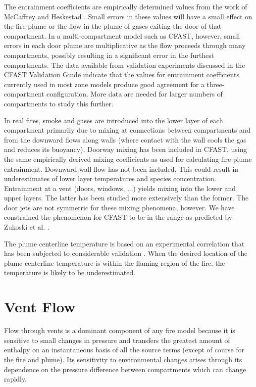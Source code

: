 The entrainment coefficients are empirically determined values from the work of McCaffrey \cite{McCaffrey:1983} and Heskestad \cite{Heskestad:1984}. Small errors in these values will have a small effect on the fire plume or the flow in the plume of gases exiting the door of that compartment.  In a multi-compartment model such as CFAST, however, small errors in each door plume are multiplicative as the flow proceeds through many compartments, possibly resulting in a significant error in the furthest compartments.  The data available from validation experiments \cite{Peacock:1988} discussed in the CFAST Validation Guide \cite{CFAST_Valid_Guide_6} indicate that the values for entrainment coefficients currently used in most zone models produce good agreement for a three-compartment configuration.  More data are needed for larger numbers of compartments to study this further.

In real fires, smoke and gases are introduced into the lower layer of each compartment primarily due to mixing at connections between compartments and from the downward flows along walls (where contact with the wall cools the gas and reduces its buoyancy).  Doorway mixing has been included in CFAST, using the same empirically derived mixing coefficients as used for calculating fire plume entrainment. Downward wall flow has not been included. This could result in underestimates of lower layer temperatures and species concentration. Entrainment at a vent (doors, windows, ...) yields mixing into the lower and upper layers. The latter has been studied more extensively than the former. The door jets are not symmetric for these mixing phenomena, however.  We have constrained the phenomenon for CFAST to be in the range as predicted by Zukoski et al. \cite{Zukoski:1985}.

The plume centerline temperature is based on an experimental correlation that has been subjected to considerable validation \cite{Valid:Davis_Plumes}. When the desired location of the plume centerline temperature is within the flaming region of the fire, the temperature is likely to be underestimated.

\section{Vent Flow}

Flow through vents is a dominant component of any fire model because it is sensitive to small changes in pressure and transfers the greatest amount of enthalpy on an instantaneous basis of all the source terms (except of course for the fire and plume).  Its sensitivity to environmental changes arises through its dependence on the pressure difference between compartments which can change rapidly.

